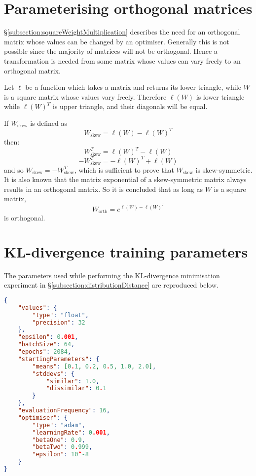 \documentclass[../main.tex]{subfiles}
\begin{document}
\section{Parameterising orthogonal matrices} \label{appendix:parameterisingOrthogonalMatrices}

\S\ref{subsection:squareWeightMultiplication} describes the need for an orthogonal matrix whose values can be changed by an optimiser.
Generally this is not possible since the majority of matrices will not be orthogonal.
Hence a transformation is needed from some matrix whose values can vary freely to an orthogonal matrix.

Let $\ell$ be a function which takes a matrix and returns its lower triangle, while $W$ is a square matrix whose values vary freely.
Therefore $\ell(W)$ is lower triangle while $\ell(W)^T$ is upper triangle, and their diagonals will be equal.

If $W_\text{skew}$ is defined as
\begin{equation}
    W_\text{skew}=\ell(W)-\ell(W)^T
\end{equation}
then:
\begin{equation}
    W_\text{skew}^T=\ell(W)^T-\ell(W)
\end{equation}
\begin{equation}
    -W_\text{skew}^T=-\ell(W)^T+\ell(W)
\end{equation}
and so $W_\text{skew}=-W_\text{skew}^T$, which is sufficient to prove that $W_\text{skew}$ is skew-symmetric.
It is also known that the matrix exponential of a skew-symmetric matrix always results in an orthogonal matrix.
So it is concluded that as long as $W$ is a square matrix,
\begin{equation}
    W_\text{orth}=e^{\ell(W)-\ell(W)^T}
\end{equation}
is orthogonal.

\section{KL-divergence training parameters} \label{appendix:klTrainingParameters}

The parameters used while performing the KL-divergence minimisation experiment in \S\ref{subsection:distributionDistance} are reproduced below.

\begin{lstlisting}[language=json,firstnumber=1,caption={Experimental parameters for minimising the KL-divergence of two distributions.},captionpos=b]
{
    "values": {
        "type": "float",
        "precision": 32
    },
    "epsilon": 0.001,
    "batchSize": 64,
    "epochs": 2084,
    "startingParameters": {
        "means": [0.1, 0.2, 0.5, 1.0, 2.0],
        "stddevs": {
            "similar": 1.0,
            "dissimilar": 0.1
        }
    },
    "evaluationFrequency": 16,
    "optimiser": {
        "type": "adam",
        "learningRate": 0.001,
        "betaOne": 0.9,
        "betaTwo": 0.999,
        "epsilon": 10^-8
    }
}
\end{lstlisting}
\end{document}
